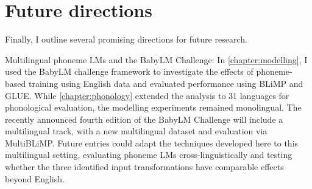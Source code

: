 

\section{Future directions}
\label{sec:17-futurework}

Finally, I outline several promising directions for future research.

Multilingual phoneme LMs and the BabyLM Challenge:
In \cref{chapter:modelling}, I used the BabyLM challenge framework to investigate the effects of phoneme-based training using English data and evaluated performance using BLiMP and GLUE. While \cref{chapter:phonology} extended the analysis to 31 languages for phonological evaluation, the modelling experiments remained monolingual. The recently announced fourth edition of the BabyLM Challenge will include a multilingual track, with a new multilingual dataset and evaluation via MultiBLiMP. Future entries could adapt the techniques developed here to this multilingual setting, evaluating phoneme LMs cross-linguistically and testing whether the three identified input transformations have comparable effects beyond English.


